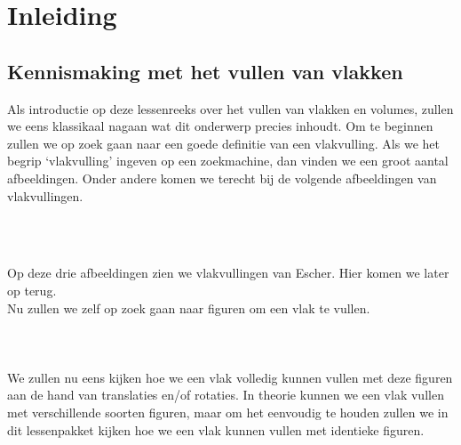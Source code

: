 \section{Inleiding}

\subsection{Kennismaking met het vullen van vlakken}
Als introductie op deze lessenreeks over het vullen van vlakken en volumes, zullen we eens klassikaal nagaan wat dit onderwerp precies inhoudt. Om te beginnen zullen we op zoek gaan naar een goede definitie van een vlakvulling. Als we het begrip `vlakvulling' ingeven op een zoekmachine, dan vinden we een groot aantal afbeeldingen. Onder andere komen we terecht bij de volgende afbeeldingen van vlakvullingen.
\begin{figure}[h]
  \centering
  \\
\end{figure}\\
Op deze drie afbeeldingen zien we vlakvullingen van Escher. Hier komen we later op terug.\\
Nu zullen we zelf op zoek gaan naar figuren om een vlak te vullen.\\ 
\\
\\
\\
We zullen nu eens kijken hoe we een vlak volledig kunnen vullen met deze figuren aan de hand van translaties en/of rotaties. In theorie kunnen we een vlak vullen met verschillende soorten figuren, maar om het eenvoudig te houden zullen we in dit lessenpakket kijken hoe we een vlak kunnen vullen met identieke figuren.\\
\\
\\
